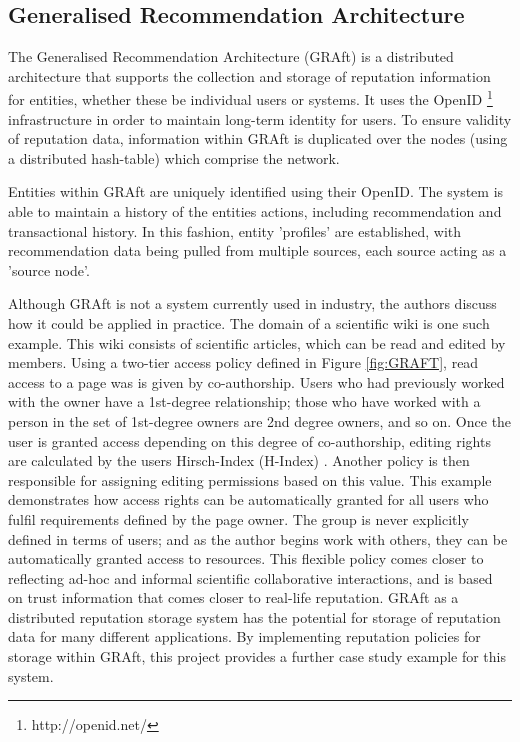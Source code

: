 \subsection{Generalised Recommendation Architecture}

The Generalised Recommendation Architecture (GRAft) \cite{graft_paper} is a distributed architecture that supports the collection and storage of reputation information for entities, whether these be individual users or systems. It uses the OpenID \footnote{http://openid.net/} infrastructure in order to maintain long-term identity for users. To ensure validity of reputation data, information within GRAft is duplicated over the nodes (using a distributed hash-table) which comprise the network. 

Entities within GRAft are uniquely identified using their OpenID. The system is able to maintain a history of the entities actions, including recommendation and transactional history. In this fashion, entity 'profiles' are established, with recommendation data being pulled from multiple sources, each source acting as a 'source node'.



Although GRAft is not a system currently used in industry, the authors discuss how it could be applied in practice. The domain of a scientific wiki is one such example. This wiki consists of scientific articles, which can be read and edited by members. Using a two-tier access policy defined in Figure \ref{fig:GRAFT}, read access to a page was is given by co-authorship. Users who had previously worked with the owner have a 1st-degree relationship; those who have worked with a person in the set of 1st-degree owners are 2nd degree owners, and so on. Once the user is granted access depending on this degree of co-authorship, editing rights are calculated by the users Hirsch-Index (H-Index) \cite{hirsch2005index}. Another policy is then responsible for assigning editing permissions based on this value. This example demonstrates how access rights can be automatically granted for all users who fulfil requirements defined by the page owner. The group is never explicitly defined in terms of users; and as the author 
begins work with others, they can be automatically granted access to resources. This flexible policy comes closer to reflecting ad-hoc and informal scientific collaborative interactions, and is based on trust information that comes closer to real-life reputation. GRAft as a distributed reputation storage system has the potential for storage of reputation data for many different applications. By implementing reputation policies for storage within GRAft, this project provides a further case study example for this system.

